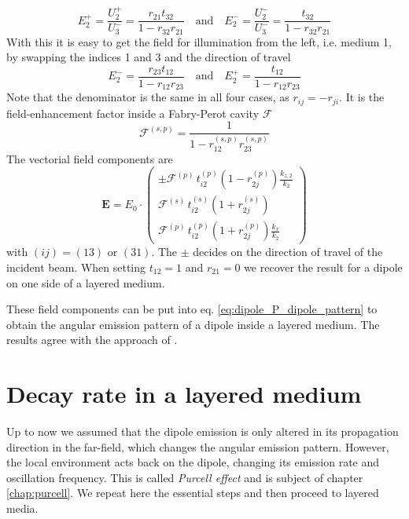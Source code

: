 \begin{equation}
E_2^+ = \frac{U_2^+}{U_3^-} 
= \frac{r_{21} t_{32}  }{1 -r_{32}  r_{21}  }
 \quad
 \text{and}
 \quad
 E_2^- = \frac{U_2^-}{U_3^-} 
  = \frac{t_{32}   }{1 -r_{32}  r_{21}  }
\end{equation}
With this it is easy to get the field for illumination from the left, i.e. medium 1, by swapping the indices 1 and 3 and the direction of travel
\begin{equation}
E_2^- 
= \frac{r_{23} t_{12}  }{1 -r_{12}  r_{23}  }
 \quad
 \text{and}
 \quad
 E_2^+ 
  = \frac{t_{12}   }{1 -r_{12}  r_{23}  }
\end{equation}
Note that the denominator is the same in all four cases, as $r_{ij} = - r_{ji}$. It is the field-enhancement factor inside a Fabry-Perot cavity $\mathcal{F}$
\begin{equation}
\mathcal{F}^{(s,p)} = \frac{1  }{1 -r_{12}^{(s,p)}   r_{23}^{(s,p)}   }
\end{equation}
The vectorial field components are 
\begin{equation}
\mathbf{E} =  
 E_0 \cdot
\begin{pmatrix}
 \pm \mathcal{F}^{(p)} \,  t_{i2}^{(p)}  \left( 1 - r_{2j}^{(p)} \right) \frac{k_{z,2} }{ k_2} \\
\mathcal{F}^{(s)}  \, t_{i2}^{(s)}  \left( 1 + r_{2j}^{(s)} \right)  \\
\mathcal{F}^{(p)}  \, t_{i2}^{(p)}  \left( 1 + r_{2j}^{(p)} \right) \frac{k_{x} }{ k_2}
\end{pmatrix}
\end{equation}
with $(ij) = (13)$ or $(31)$. The $\pm$ decides on the direction of travel of the incident beam. When setting $t_{12} = 1$ and $r_{21} = 0$ we recover the result for a dipole on one side of a layered medium.

These field components can be put into eq. \ref{eq:dipole_P_dipole_pattern} to obtain the angular emission pattern of a dipole inside a layered medium. The results agree with the approach of \cite{Polerecky00}.



\section{Decay rate in a layered medium}

Up to now we assumed that the dipole emission is only altered in its propagation direction in the far-field, which changes the angular emission pattern. However, the local environment acts back on the dipole, changing its emission rate and oscillation frequency. This is called \emph{Purcell effect} and is subject of chapter \ref{chap:purcell}. We repeat here the essential steps and then proceed to layered media.


